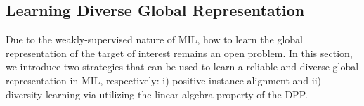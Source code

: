 \documentclass[runningheads]{llncs}
\begin{document}

\subsection{Learning Diverse Global Representation}
\label{sec:GRCL}
Due to the weakly-supervised nature of MIL, how to learn the global representation of the target of interest remains an open problem. In this section, we introduce two strategies that can be used to learn a reliable and diverse global representation in MIL, respectively: i) positive instance alignment and ii) diversity learning via utilizing the linear algebra property of the DPP.
\end{document}
